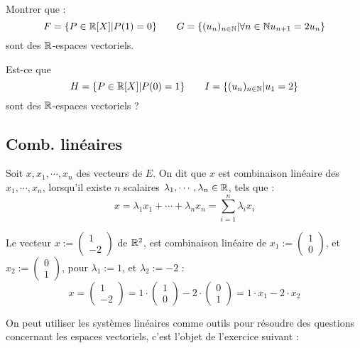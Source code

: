 \begin{exo}
	Montrer que :
	\[
		F = \{ P \in \mathbb{R}[X] \vert P(1) = 0 \} \qquad 	G = \{ (u_n)_{n\in \mathbb{N}} \vert \forall n \in \mathbb{N} u_{n+1}=2u_n \}
	\]
	\noindent sont des $\mathbb{R}$-espaces vectoriels.
\end{exo}

\begin{exo}
	Est-ce que 
	\begin{equation*}
		H = \{ P \in \mathbb{R}[X] \vert P(0) = 1 \} \qquad I = \{ (u_n)_{n\in \mathbb{N}} \vert u_1 = 2 \}
	\end{equation*}
	\noindent sont des $\mathbb{R}$-espaces vectoriels ?
\end{exo}


\subsection{Comb. linéaires}


\Def
{
	Soit $x,x_1,\cdots, x_n$ des vecteurs de $E$. On dit que $x$ est \textcolor{gold2}{combinaison linéaire} des $x_1, \cdots ,x_n$, lorsqu'il existe $n$ scalaires $\lambda_1,\cdots, \lambda_n \in \mathbb{R}$, tels que :
	\[ 
		x  = \lambda_1 x_1 +\cdots + \lambda_n x_n = \sum_{i= 1}^n \lambda_i x_i 
	\]
}

\example
	Le vecteur $x:=\begin{pmatrix} 1 \\-2 \end{pmatrix}$ de $\mathbb{R}^2$, est combinaison linéaire de $x_1 := \begin{pmatrix} 1 \\0 \end{pmatrix}$, et $x_2 := \begin{pmatrix} 0 \\1 \end{pmatrix}$, pour $\lambda_1 :=1$, et $\lambda_2 := -2$ :
	\[
		x=  \begin{pmatrix} 1 \\-2 \end{pmatrix} = 1 \cdot \begin{pmatrix} 1 \\0 \end{pmatrix} -2 \cdot  \begin{pmatrix} 0 \\1 \end{pmatrix} = 1\cdot x_1 -2 \cdot x_2  
	\]

On peut utiliser les systèmes linéaires comme outils pour résoudre des questions concernant les espaces vectoriels, c'est l'objet de l'exercice suivant :

